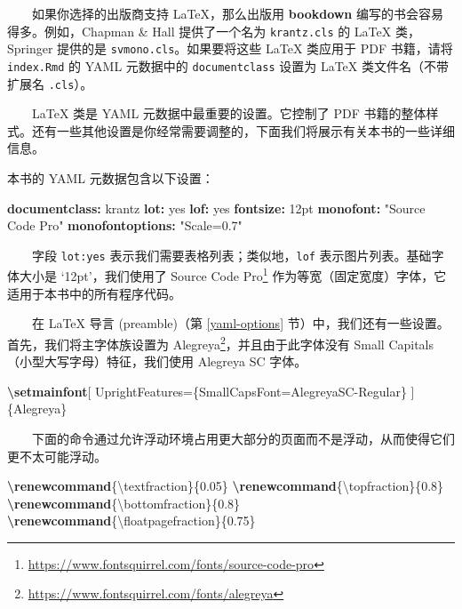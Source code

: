 \documentclass[
  12pt,
]{krantz}
\newenvironment{Shaded}{\begin{snugshade}}{\end{snugshade}}
\newcommand{\AttributeTok}[1]{\textcolor[rgb]{0.13,0.29,0.53}{#1}}
\newcommand{\CharTok}[1]{\textcolor[rgb]{0.31,0.60,0.02}{#1}}
\newcommand{\ExtensionTok}[1]{#1}
\newcommand{\FunctionTok}[1]{\textcolor[rgb]{0.13,0.29,0.53}{\textbf{#1}}}
\newcommand{\KeywordTok}[1]{\textcolor[rgb]{0.13,0.29,0.53}{\textbf{#1}}}
\newcommand{\NormalTok}[1]{#1}
\newcommand{\StringTok}[1]{\textcolor[rgb]{0.31,0.60,0.02}{#1}}
\renewcommand{\href}[2]{#2\footnote{\url{#1}}}
\theoremstyle{definition}
\theoremstyle{definition}
\theoremstyle{definition}
\theoremstyle{definition}
\theoremstyle{remark}
\begin{document}
  如果你选择的出版商支持 LaTeX，那么出版用 \textbf{bookdown} 编写的书会容易得多。例如，Chapman \& Hall 提供了一个名为 \texttt{krantz.cls} 的 LaTeX 类，Springer 提供的是 \texttt{svmono.cls}。如果要将这些 LaTeX 类应用于 PDF 书籍，请将 \texttt{index.Rmd} 的 YAML 元数据中的 \texttt{documentclass} 设置为 LaTeX 类文件名（不带扩展名 \texttt{.cls}）。

  LaTeX 类是 YAML 元数据中最重要的设置。它控制了 PDF 书籍的整体样式。还有一些其他设置是你经常需要调整的，下面我们将展示有关本书的一些详细信息。

本书的 YAML 元数据包含以下设置：

\begin{Shaded}
\begin{Highlighting}[]
\FunctionTok{documentclass}\KeywordTok{:}\AttributeTok{ krantz}
\FunctionTok{lot}\KeywordTok{:}\AttributeTok{ }\CharTok{yes}
\FunctionTok{lof}\KeywordTok{:}\AttributeTok{ }\CharTok{yes}
\FunctionTok{fontsize}\KeywordTok{:}\AttributeTok{ 12pt}
\FunctionTok{monofont}\KeywordTok{:}\AttributeTok{ }\StringTok{"Source Code Pro"}
\FunctionTok{monofontoptions}\KeywordTok{:}\AttributeTok{ }\StringTok{"Scale=0.7"}
\end{Highlighting}
\end{Shaded}

  字段 \texttt{lot:yes} 表示我们需要表格列表；类似地，\texttt{lof} 表示图片列表。基础字体大小是 `12pt'，我们使用了 \href{https://www.fontsquirrel.com/fonts/source-code-pro}{Source Code Pro} 作为等宽（固定宽度）字体，它适用于本书中的所有程序代码。

  在 LaTeX 导言 (preamble)（第 \ref{yaml-options} 节）中，我们还有一些设置。首先，我们将主字体族设置为 \href{https://www.fontsquirrel.com/fonts/alegreya}{Alegreya}，并且由于此字体没有 {Small Capitals}（小型大写字母）特征，我们使用 Alegreya SC 字体。

\begin{Shaded}
\begin{Highlighting}[]
\FunctionTok{\textbackslash{}setmainfont}\NormalTok{[}
\NormalTok{  UprightFeatures=\{SmallCapsFont=AlegreyaSC{-}Regular\}}
\NormalTok{]\{Alegreya\}}
\end{Highlighting}
\end{Shaded}

  下面的命令通过允许浮动环境占用更大部分的页面而不是浮动，从而使得它们更不太可能浮动。

\begin{Shaded}
\begin{Highlighting}[]
\FunctionTok{\textbackslash{}renewcommand}\NormalTok{\{}\ExtensionTok{\textbackslash{}textfraction}\NormalTok{\}\{0.05\}}
\FunctionTok{\textbackslash{}renewcommand}\NormalTok{\{}\ExtensionTok{\textbackslash{}topfraction}\NormalTok{\}\{0.8\}}
\FunctionTok{\textbackslash{}renewcommand}\NormalTok{\{}\ExtensionTok{\textbackslash{}bottomfraction}\NormalTok{\}\{0.8\}}
\FunctionTok{\textbackslash{}renewcommand}\NormalTok{\{}\ExtensionTok{\textbackslash{}floatpagefraction}\NormalTok{\}\{0.75\}}
\end{Highlighting}
\end{Shaded}
\end{document}

